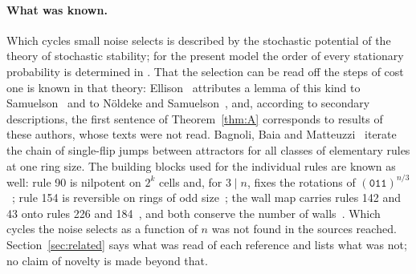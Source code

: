 \documentclass[10pt,a4paper]{article}
\newcommand{\code}[1]{\mathtt{#1}}            %
\begin{document}
\paragraph{What was known.}
Which cycles small noise selects is described by the stochastic potential of the theory of stochastic stability;
for the present model the order of every stationary probability is determined in \cite{PeterleinNote}. That the
selection can be read off the steps of cost one is known in that theory: Ellison~\cite{Ellison2000} attributes a
lemma of this kind to Samuelson~\cite{Samuelson1994} and to N\"oldeke and Samuelson~\cite{NoldekeSamuelson1993}, and,
according to secondary descriptions, the first sentence of Theorem~\ref{thm:A} corresponds to results of these
authors, whose texts were not read. Bagnoli, Baia and
Matteuzzi~\cite{BagnoliBaiaMatteuzzi2025} iterate the chain of single-flip jumps between attractors for all classes
of elementary rules at one ring size. The building blocks used for the individual rules are known as well: rule 90
is nilpotent on $2^k$ cells and, for $3\mid n$, fixes the rotations of
$(\code{011})^{n/3}$~\cite{MartinOdlyzkoWolfram1984}; rule 154 is reversible on rings of odd
size~\cite{BhattacharjeeDas2019,Fedoriaka2025,NobeYura2004}; the wall map carries rules 142 and 43 onto rules 226
and 184~\cite{Boccara1993,Fuks2005,Fuks2005b}, and both conserve the number of walls~\cite{Fuks2005,Fuks2005b}.
Which cycles the noise selects as a function of $n$ was not found in the sources reached. Section~\ref{sec:related}
says what was read of each reference and lists what was not; no claim of novelty is made beyond that.
\end{document}
